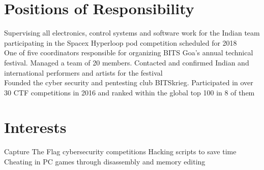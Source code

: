 \documentclass[]{illustris-resume-openfont}
\begin{document}
\begin{minipage}[t]{0.66\textwidth}
\section{Positions of Responsibility}
Supervising all electronics, control systems and software work for the Indian team participating in the Spacex Hyperloop pod competition scheduled for 2018\\
\sectionsep
{}
One of five coordinators responsible for organizing BITS Goa's annual technical festival. Managed a team of 20 members. Contacted and confirmed Indian and international performers and artists for the festival\\
\sectionsep
{}
Founded the cyber security and pentesting club BITSkrieg. Participated in over 30 CTF competitions in 2016 and ranked within the global top 100 in 8 of them

\section{Interests}
Capture The Flag cybersecurity competitions \textbullet{} Hacking scripts to save time \textbullet{} Cheating in PC games through disassembly and memory editing
\sectionsep

\end{minipage} 
\end{document}
